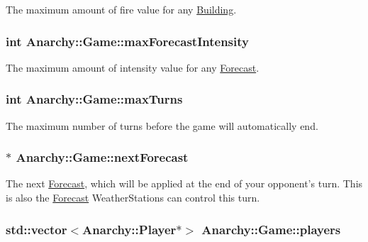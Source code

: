 The maximum amount of fire value for any \hyperlink{classAnarchy_1_1Building}{Building}. 

\hypertarget{classAnarchy_1_1Game_a6565f400e8dcdeecb5466a76f3da9beb}{
\subsubsection[{max\-Forecast\-Intensity}]{\setlength{\rightskip}{0pt plus 5cm}int Anarchy\-::\-Game\-::max\-Forecast\-Intensity}}\label{classAnarchy_1_1Game_a6565f400e8dcdeecb5466a76f3da9beb}


The maximum amount of intensity value for any \hyperlink{classAnarchy_1_1Forecast}{Forecast}. 

\hypertarget{classAnarchy_1_1Game_a47e287119862163ec1bd33f0f5be15c0}{
\subsubsection[{max\-Turns}]{\setlength{\rightskip}{0pt plus 5cm}int Anarchy\-::\-Game\-::max\-Turns}}\label{classAnarchy_1_1Game_a47e287119862163ec1bd33f0f5be15c0}


The maximum number of turns before the game will automatically end. 

\hypertarget{classAnarchy_1_1Game_ab5709ad48347f087ca94fc6912be6da3}{
\subsubsection[{next\-Forecast}]{$\ast$ Anarchy\-::\-Game\-::next\-Forecast}}\label{classAnarchy_1_1Game_ab5709ad48347f087ca94fc6912be6da3}


The next \hyperlink{classAnarchy_1_1Forecast}{Forecast}, which will be applied at the end of your opponent's turn. This is also the \hyperlink{classAnarchy_1_1Forecast}{Forecast} Weather\-Stations can control this turn. 

\hypertarget{classAnarchy_1_1Game_a7320fea6bc1ac442a31ec2b96dd9eee8}{
\subsubsection[{players}]{\setlength{\rightskip}{0pt plus 5cm}std\-::vector$<${\bf Anarchy\-::\-Player}$\ast$$>$ Anarchy\-::\-Game\-::players}}\label{classAnarchy_1_1Game_a7320fea6bc1ac442a31ec2b96dd9eee8}


